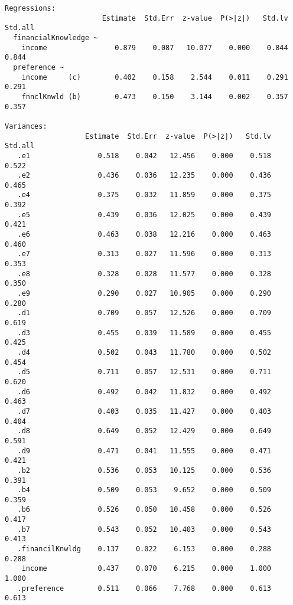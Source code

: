\documentclass[
  super,
  preprint,
  3p]{elsarticle}
\begin{document}
\begin{verbatim}
Regressions:
                       Estimate  Std.Err  z-value  P(>|z|)   Std.lv  Std.all
  financialKnowledge ~                                                      
    income                0.879    0.087   10.077    0.000    0.844    0.844
  preference ~                                                              
    income     (c)        0.402    0.158    2.544    0.011    0.291    0.291
    fnnclKnwld (b)        0.473    0.150    3.144    0.002    0.357    0.357

Variances:
                   Estimate  Std.Err  z-value  P(>|z|)   Std.lv  Std.all
   .e1                0.518    0.042   12.456    0.000    0.518    0.522
   .e2                0.436    0.036   12.235    0.000    0.436    0.465
   .e4                0.375    0.032   11.859    0.000    0.375    0.392
   .e5                0.439    0.036   12.025    0.000    0.439    0.421
   .e6                0.463    0.038   12.216    0.000    0.463    0.460
   .e7                0.313    0.027   11.596    0.000    0.313    0.353
   .e8                0.328    0.028   11.577    0.000    0.328    0.350
   .e9                0.290    0.027   10.905    0.000    0.290    0.280
   .d1                0.709    0.057   12.526    0.000    0.709    0.619
   .d3                0.455    0.039   11.589    0.000    0.455    0.425
   .d4                0.502    0.043   11.780    0.000    0.502    0.454
   .d5                0.711    0.057   12.531    0.000    0.711    0.620
   .d6                0.492    0.042   11.832    0.000    0.492    0.463
   .d7                0.403    0.035   11.427    0.000    0.403    0.404
   .d8                0.649    0.052   12.429    0.000    0.649    0.591
   .d9                0.471    0.041   11.555    0.000    0.471    0.421
   .b2                0.536    0.053   10.125    0.000    0.536    0.391
   .b4                0.509    0.053    9.652    0.000    0.509    0.359
   .b6                0.526    0.050   10.458    0.000    0.526    0.417
   .b7                0.543    0.052   10.403    0.000    0.543    0.413
   .financilKnwldg    0.137    0.022    6.153    0.000    0.288    0.288
    income            0.437    0.070    6.215    0.000    1.000    1.000
   .preference        0.511    0.066    7.768    0.000    0.613    0.613
\end{verbatim}
\end{document}
